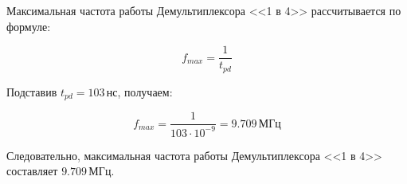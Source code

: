 Максимальная частота работы Демультиплексора <<1 в 4>> рассчитывается по формуле:

\[
	f_{max} = \frac{1}{t_{pd}}
\]

Подставив \( t_{pd} = 103 \, \text{нс} \), получаем:

\[
	f_{max} = \frac{1}{103 \cdot 10^{-9}} = 9.709 \, \text{МГц}
\]

Следовательно, максимальная частота работы Демультиплексора <<1 в 4>> составляет \( 9.709 \, \text{МГц} \).
